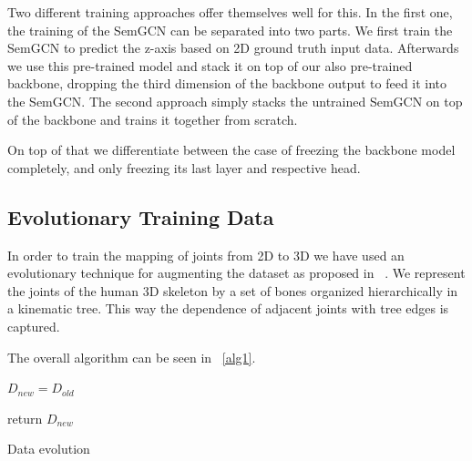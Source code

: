 Two different training approaches offer themselves well for this.
In the first one, the training of the SemGCN can be separated into two parts.
We first train the SemGCN to predict the z-axis based on 2D ground truth input data.
Afterwards we use this pre-trained model and stack it on top of our also pre-trained backbone,
dropping the third dimension of the backbone output to feed it into the SemGCN.
The second approach simply stacks the untrained SemGCN on top of the backbone and trains it
together from scratch.

On top of that we differentiate between the case of freezing the backbone model completely, and only
freezing its last layer and respective head.

\subsection{Evolutionary Training Data}
In order to train the mapping of joints from 2D to 3D we have used an evolutionary technique for augmenting the dataset as proposed in ~\cite{Li_2020_CVPR}.
We represent the joints of the human 3D skeleton by a set of bones organized hierarchically in a kinematic tree. This way the dependence of adjacent joints with tree edges is captured.





The overall algorithm can be seen in ~\ref{alg1}.

\begin{algorithm}

    $D_{new} = D_{old}$

    return $D_{new}$
    \caption{Data evolution}
    \label{alg1}
\end{algorithm}

